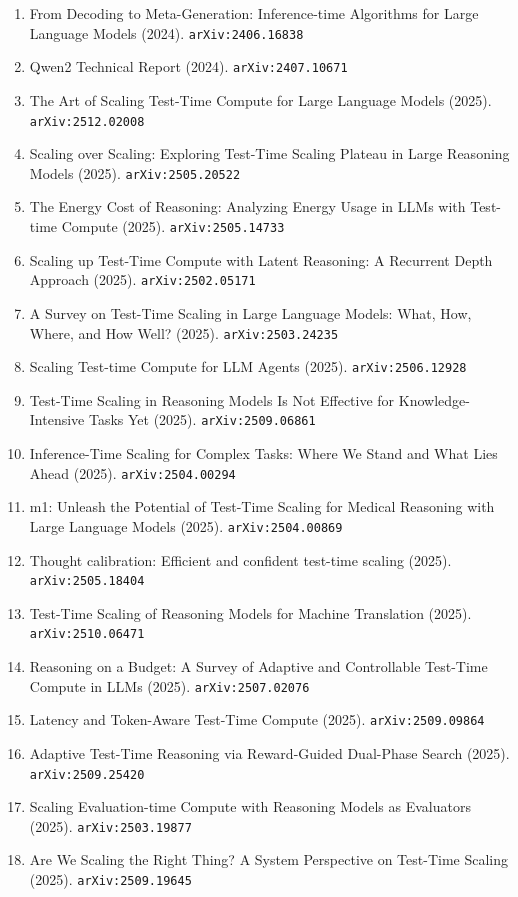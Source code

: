 \documentclass[11pt]{article}
\begin{document}
\begin{enumerate}
  \item From Decoding to Meta-Generation: Inference-time Algorithms for Large
  Language Models (2024). \texttt{arXiv:2406.16838}
  \item Qwen2 Technical Report (2024). \texttt{arXiv:2407.10671}
  \item The Art of Scaling Test-Time Compute for Large Language Models (2025). \texttt{arXiv:2512.02008}
  \item Scaling over Scaling: Exploring Test-Time Scaling Plateau in Large Reasoning Models (2025). \texttt{arXiv:2505.20522}
  \item The Energy Cost of Reasoning: Analyzing Energy Usage in LLMs with Test-time Compute (2025). \texttt{arXiv:2505.14733}
  \item Scaling up Test-Time Compute with Latent Reasoning: A Recurrent Depth
  Approach (2025). \texttt{arXiv:2502.05171}
  \item A Survey on Test-Time Scaling in Large Language Models: What, How,
  Where, and How Well? (2025). \texttt{arXiv:2503.24235}
  \item Scaling Test-time Compute for LLM Agents (2025). \texttt{arXiv:2506.12928}
  \item Test-Time Scaling in Reasoning Models Is Not Effective for Knowledge-Intensive Tasks Yet (2025). \texttt{arXiv:2509.06861}
  \item Inference-Time Scaling for Complex Tasks: Where We Stand and What Lies
  Ahead (2025). \texttt{arXiv:2504.00294}
  \item m1: Unleash the Potential of Test-Time Scaling for Medical Reasoning with Large Language Models (2025). \texttt{arXiv:2504.00869}
  \item Thought calibration: Efficient and confident test-time scaling (2025). \texttt{arXiv:2505.18404}
  \item Test-Time Scaling of Reasoning Models for Machine Translation (2025). \texttt{arXiv:2510.06471}
  \item Reasoning on a Budget: A Survey of Adaptive and Controllable Test-Time Compute in LLMs (2025). \texttt{arXiv:2507.02076}
  \item Latency and Token-Aware Test-Time Compute (2025). \texttt{arXiv:2509.09864}
  \item Adaptive Test-Time Reasoning via Reward-Guided Dual-Phase Search (2025). \texttt{arXiv:2509.25420}
  \item Scaling Evaluation-time Compute with Reasoning Models as Evaluators (2025). \texttt{arXiv:2503.19877}
  \item Are We Scaling the Right Thing? A System Perspective on Test-Time Scaling (2025). \texttt{arXiv:2509.19645}

\end{enumerate}
\end{document}
